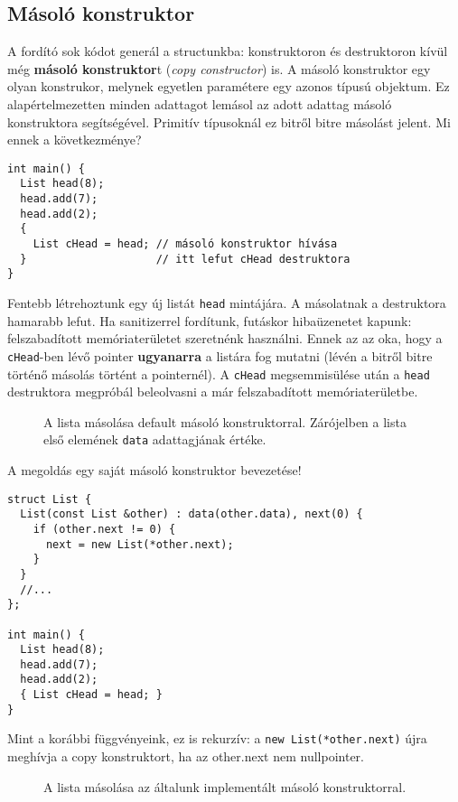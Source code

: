 \documentclass[../cpp_book/cpp_book.tex]{subfiles}
\begin{document}
	\subsection{Másoló konstruktor}
	
	A fordító sok kódot generál a structunkba: konstruktoron és destruktoron kívül még \textbf{másoló konstruktor}t (\textit{copy constructor}) is. A másoló konstruktor egy olyan konstrukor, melynek egyetlen paramétere egy azonos típusú objektum. Ez alapértelmezetten minden adattagot lemásol az adott adattag másoló konstruktora segítségével. Primitív típusoknál ez bitről bitre másolást jelent. Mi ennek a következménye?
	\begin{lstlisting}
int main() {
  List head(8);
  head.add(7);
  head.add(2);
  {
    List cHead = head; // másoló konstruktor hívása
  }                    // itt lefut cHead destruktora
}
	\end{lstlisting}
	Fentebb létrehoztunk egy új listát \texttt{head} mintájára. A másolatnak a destruktora hamarabb lefut. Ha sanitizerrel fordítunk, futáskor hibaüzenetet kapunk: felszabadított memóriaterületet szeretnénk használni. Ennek az az oka, hogy a \texttt{cHead}-ben lévő pointer \textbf{ugyanarra} a listára fog mutatni (lévén a bitről bitre történő másolás történt a pointernél). A \texttt{cHead} megsemmisülése után a \texttt{head} destruktora megpróbál beleolvasni a már felszabadított memóriaterületbe.
	
	\begin{figure}[!h]
		\centering
		
		
		\caption{A lista másolása default másoló konstruktorral. Zárójelben a lista első elemének \texttt{data} adattagjának értéke.}\label{fig_list_copy_ctor_wrong}
	\end{figure}
	
	A megoldás egy saját másoló konstruktor bevezetése!
	
	
\begin{lstlisting}
struct List {
  List(const List &other) : data(other.data), next(0) {
    if (other.next != 0) {
      next = new List(*other.next);
    }
  }
  //...
};

int main() {
  List head(8);
  head.add(7);
  head.add(2);
  { List cHead = head; }
}
\end{lstlisting}
	Mint a korábbi függvényeink, ez is rekurzív: a \texttt{new List(*other.next)} újra meghívja a copy konstruktort, ha az other.next nem nullpointer.
	\begin{figure}[!h]
		\centering
		
		\caption{A lista másolása az általunk implementált másoló konstruktorral.}\label{fig_list_copy_ctor_correct}
	\end{figure}
	
\end{document}
